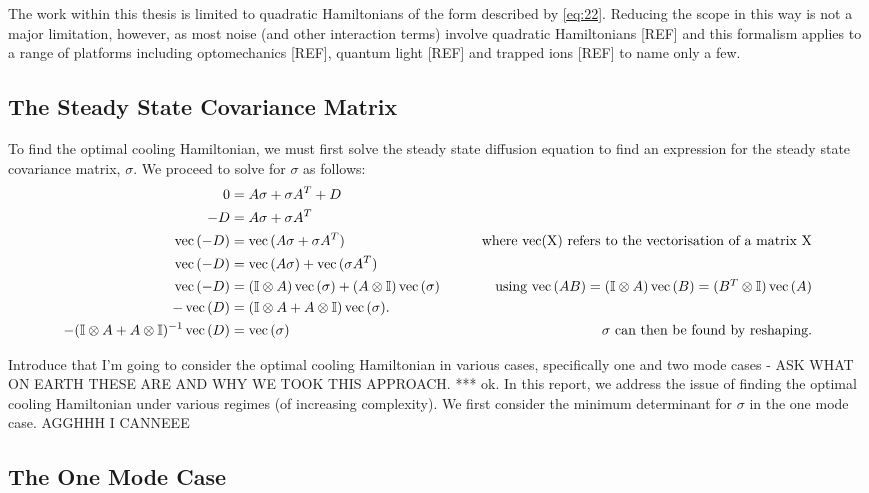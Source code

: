 \documentclass[11pt,a4paper]{article}
\numberwithin{equation}{section}
\DeclareMathOperator{\Vect}{vec}
\begin{document}
	The work within this thesis is limited to quadratic Hamiltonians of the form described by \ref{eq:22}. Reducing the scope in this way is not a major limitation, however, as most noise (and other interaction terms) involve quadratic Hamiltonians [REF] and this formalism applies to a range of platforms including optomechanics [REF], quantum light [REF] and trapped ions [REF] to name only a few. 
	
	\subsection{The Steady State Covariance Matrix}
	\label{sec:sigmasolve}
	
	To find the optimal cooling Hamiltonian, we must first solve the steady state diffusion equation to find an expression for the steady state covariance matrix, $\sigma$. We proceed to solve for $\sigma$ as follows:
	\begin{align*}
	0 &= A\sigma +\sigma A^{T} + D&\\
	-D &= A\sigma +\sigma A^{T}&\\
	\Vect{(-D)} &= \Vect{(A\sigma +\sigma A^{T})}& \tag*{\text{where vec(X) refers to the vectorisation of a matrix X}}\\
	\Vect{(-D)} &= \Vect{(A\sigma)} + \Vect{(\sigma A^{T})}&\\
	\Vect{(-D)} &= (\mathbb{I} \otimes A)\Vect{(\sigma)} + (A \otimes \mathbb{I})\Vect{(\sigma)} & \tag*{\text{using $\Vect{(AB)}=(\mathbb{I} \otimes A)\Vect{(B)}=(B^{T} \otimes \mathbb{I})\Vect{(A)} $}}\\
	-\Vect{(D)} &= (\mathbb{I} \otimes A + A \otimes \mathbb{I}) \Vect{(\sigma)}.&\\
	-(\mathbb{I} \otimes A + A \otimes \mathbb{I})^{-1}\Vect{(D)} &= \Vect{(\sigma)}& \tag*{$\sigma$ can then be found by reshaping.}
	\end{align*}
	 
	\color{blue}Introduce that I'm going to consider the optimal cooling Hamiltonian in various cases, specifically one and two mode cases - ASK WHAT ON EARTH THESE ARE AND WHY WE TOOK THIS APPROACH. *** ok. In this report, we address the issue of finding the optimal cooling Hamiltonian under various regimes (of increasing complexity). We first consider the minimum determinant for $\sigma$ in the one mode case. AGGHHH I CANNEEE \color{black}	
	
	\subsection{The One Mode Case}
	\label{sec:onemode}
\end{document}
